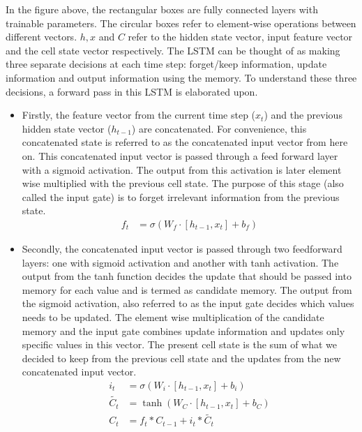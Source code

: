 \documentclass{article}
\begin{document}
In the figure above, the rectangular boxes are fully connected layers with trainable parameters. The circular boxes refer to element-wise operations between different vectors. $h, x $ and $C$ refer to the hidden state vector, input feature vector and the cell state vector respectively. The LSTM can be thought of as making three separate decisions at each time step: forget/keep information, update information and output information using the memory. To understand these three decisions, a forward pass in this LSTM is elaborated upon.
\begin{itemize}
    \item Firstly, the feature vector  from the current time step ($x_t$) and the previous hidden state vector ($h_{t-1}$) are concatenated. For convenience, this concatenated state is referred to as the concatenated input vector from here on.  This concatenated input vector is passed through a feed forward layer with a sigmoid activation. The output from this activation is later element wise multiplied with the previous cell state. The purpose of this stage (also called the input gate) is to forget irrelevant information from the previous state. 
    \begin{equation}
    \begin{split}
        f_t&=\sigma(W_f\cdot[h_{t-1},x_t]+b_f)
    \end{split}
    \end{equation}
    \item Secondly, the concatenated input vector is passed through two feedforward layers: one with sigmoid activation and another with tanh activation. The output from the tanh function decides the update that should be passed into memory for each value and is termed as candidate memory. The output from the sigmoid activation, also referred to as the input gate decides which values needs to be updated. The element wise multiplication of the candidate memory and the input gate combines update information and updates only specific values in this vector. The present cell state is the sum of what we decided to keep from the previous cell state and the updates from the new concatenated input vector. 
    \begin{equation}
        \begin{split}
            i_t&=\sigma(W_i\cdot[h_{t-1},x_t]+b_i)\\
            \tilde{C_t}&=\tanh(W_C\cdot[h_{t-1},x_t]+b_C)\\
            C_t&=f_t*C_{t-1}+i_t*\tilde{C_t}
        \end{split}

\end{equation}
\end{itemize}
\end{document}

